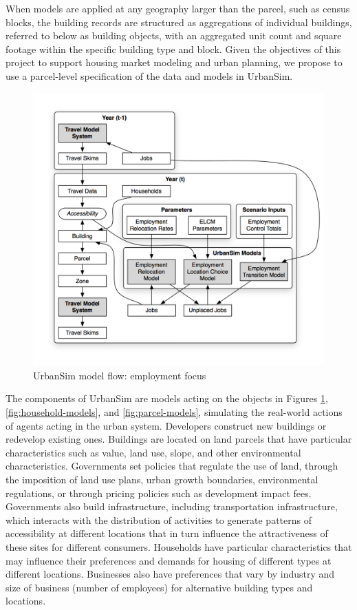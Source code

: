 When models are applied at any geography larger than the parcel, such as census blocks, the building records are structured as aggregations of individual buildings, referred to below as building objects, with an aggregated unit count and square footage within the specific building type and block. Given the objectives of this project to support housing market modeling and urban planning, we propose to use a parcel-level specification of the data and models in UrbanSim. 


\begin{figure}[htbp]
    \center
    \includegraphics[width=\textwidth]{graphics/ParcelEmploymentModel.png}
    \caption{UrbanSim model flow: employment focus}
    \label{fig:employment-models}
\end{figure}

The components of UrbanSim are models acting on the objects in Figures \ref{fig:employment-models}, \ref{fig:household-models}, and \ref{fig:parcel-models}, simulating the real-world actions of agents acting in the urban system. Developers construct new buildings or redevelop existing ones. Buildings are located on land parcels that have particular characteristics such as value, land use, slope, and other environmental characteristics. Governments set policies that regulate the use of land, through the imposition of land use plans, urban growth boundaries, environmental regulations, or through pricing policies such as development impact fees. Governments also build infrastructure, including transportation infrastructure, which interacts with the distribution of activities to generate patterns of accessibility at different locations that in turn influence the attractiveness of these sites for different consumers. Households have particular characteristics that may influence their preferences and demands for housing of different types at different locations. Businesses also have preferences that vary by industry and size of business (number of employees) for alternative building types and locations.

